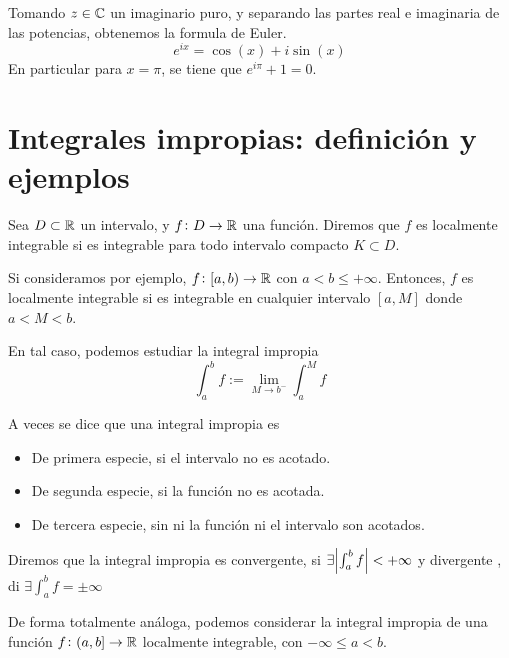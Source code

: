 \begin{prop*}
	Tomando $z \in \mathbb{C}$ un imaginario puro, y separando las partes real e imaginaria
	de las potencias, obtenemos la formula de Euler.
	\[
		e^{ix} = \cos(x) + i\sin(x)
	\]
	En particular para $x = \pi$, se tiene que $e^{i\pi} + 1 = 0$.
\end{prop*}



\section{Integrales impropias: definición y ejemplos}

\begin{defi}
	Sea $D \subset \mathbb{R}$ un intervalo, y $f \colon D \to \mathbb{R}$ una función.
	Diremos que $f$ es localmente integrable si es integrable para todo intervalo
	compacto $K \subset D$.
\end{defi}
\begin{obs}
	Si consideramos por ejemplo, $f \colon [a,b) \to \mathbb{R}$ con $a < b \leq +\infty$.
	Entonces, $f$ es localmente integrable si es integrable en cualquier intervalo
	$[a,M]$ donde $a < M < b$.

	En tal caso, podemos estudiar la integral impropia
	\[
		\int^b_a f := \lim_{M \to b^-} \int^M_a f
	\]
\end{obs}

\begin{obs*}
	A veces se dice que una integral impropia es
	\begin{itemize}
		\item De primera especie, si el intervalo no es acotado.
		\item De segunda especie, si la función no es acotada.
		\item De tercera especie, sin ni la función ni el intervalo son acotados.
	\end{itemize}
\end{obs*}

\begin{defi}
	Diremos que la integral impropia es convergente, si $\exists\abs{\int^b_a f}
	<+\infty$ y divergente , di $\exists\int^b_a f = \pm\infty$
\end{defi}

\begin{obs}
	De forma totalmente análoga, podemos considerar la integral impropia de una
	función $f \colon (a,b] \to \mathbb{R}$ localmente integrable, con $-\infty \leq a
	< b$.
\end{obs}

